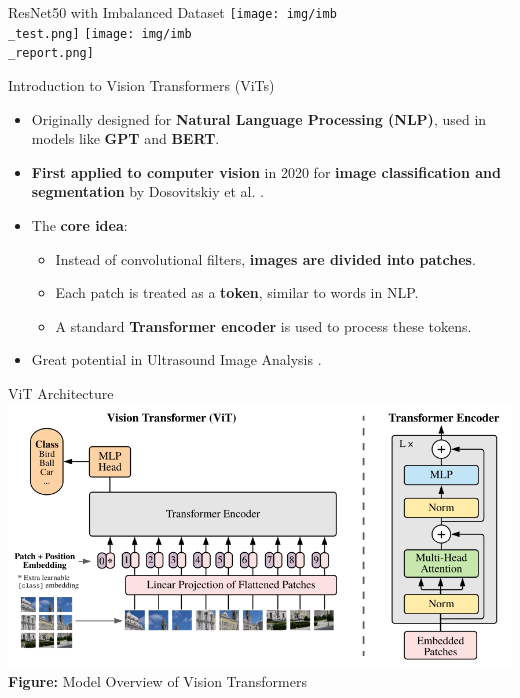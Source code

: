 \documentclass{beamer}
\begin{document}
\begin{frame}{ResNet50 with Imbalanced Dataset}
	\centering
     	\texttt{[image: img/imb\\\_test.png]}
	\texttt{[image: img/imb\\\_report.png]}
\end{frame}

\begin{frame}{Introduction to Vision Transformers (ViTs)}
    \begin{itemize}
        \item Originally designed for \textbf{Natural Language Processing (NLP)}, used in models like \textbf{GPT} and \textbf{BERT}.
        \item \textbf{First applied to computer vision} in 2020 for \textbf{image classification and segmentation} by Dosovitskiy et al. \cite{vit}.
        \item The \textbf{core idea}:
        \begin{itemize}
            \item Instead of convolutional filters, \textbf{images are divided into patches}.
            \item Each patch is treated as a \textbf{token}, similar to words in NLP.
            \item A standard \textbf{Transformer encoder} is used to process these tokens.
        \end{itemize}
	\item Great potential in Ultrasound Image Analysis \cite{vit-us}.
    \end{itemize}
\end{frame}

\begin{frame}{ViT Architecture}
	\centering
    \includegraphics[width=\textwidth]{img/vit_arch.png}
    \newline
\newline
    	\textbf{Figure:} Model Overview of Vision Transformers
\end{frame}
\end{document}
